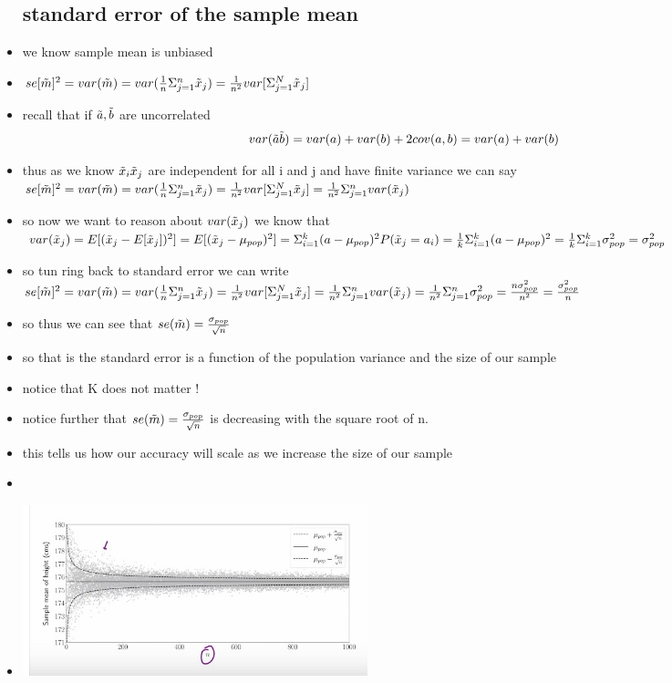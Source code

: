 \documentclass{article}
\begin{document}
\begin{itemize}
\subsection{standard error of the sample mean}
 \item we know sample mean is unbiased
 \item $se[\Tilde{m}]^2=var(\Tilde{m})=var(\frac{1}{n}\Sigma_{j=1}^{n}\Tilde{x}_{j})=\frac{1}{n^2}var[\Sigma_{j=1}^{N}\Tilde{x}_j]$
 \item recall that if $\Tilde{a}, \Tilde{b}$ are uncorrelated $$var(\Tilde{a}\Tilde{b})=var(a)+var(b)+2cov(a,b)=var(a)+var(b)$$
 \item thus as we know $\Tilde{x}_i\Tilde{x}_{j}$ are independent for all i and j and have finite variance we can say$se[\Tilde{m}]^2=var(\Tilde{m})=var(\frac{1}{n}\Sigma_{j=1}^{n}\Tilde{x}_{j})=\frac{1}{n^2}var[\Sigma_{j=1}^{N}\Tilde{x}_j]=\frac{1}{n^2}\Sigma_{j=1}^{n}var(\Tilde{x}_{j})$
 \item so now we want to reason about $var(\Tilde{x}_j)$ we know that $var(\Tilde{x}_j)=E[(\Tilde{x}_j-E[\Tilde{x}_j])^2]=E[(\Tilde{x}_j-\mu_{pop})^2]=\Sigma_{i=1}^{k}(a-\mu_{pop})^2P(\Tilde{x}_{j}=a_i)=\frac{1}{k}\Sigma_{i=1}^{k}(a-\mu_{pop})^2=\frac{1}{k}\Sigma_{i=1}^{k}\sigma_{pop}^2=\sigma_{pop}^2$
 \item so tun ring back to standard error we can write $se[\Tilde{m}]^2=var(\Tilde{m})=var(\frac{1}{n}\Sigma_{j=1}^{n}\Tilde{x}_{j})=\frac{1}{n^2}var[\Sigma_{j=1}^{N}\Tilde{x}_j]=\frac{1}{n^2}\Sigma_{j=1}^{n}var(\Tilde{x}_{j})=\frac{1}{n^2}\Sigma_{j=1}^{n}\sigma^2_{pop}=\frac{n\sigma^2_{pop}}{n^2}=\frac{\sigma_{pop}^2}{n}$
 \item so thus we can see that $se(\Tilde{m})=\frac{\sigma_{pop}}{\sqrt{n}}$
\item so that is the standard error is a function of the population variance and the size of our sample
\item notice that K does not matter !
\item notice further that $se(\Tilde{m})=\frac{\sigma_{pop}}{\sqrt{n}}$ is decreasing with the square root of n. 
\item this tells us how our accuracy will scale as we increase the size of our sample
\item \item\includegraphics[width=10cm]{notes/week_3/Video 2: the standard error/immages/v_2_1.jpg}

\end{itemize}
\end{document}
